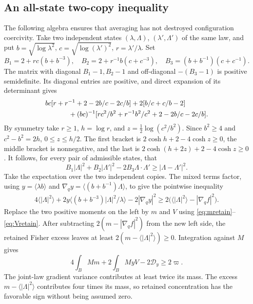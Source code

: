 \documentclass[11pt]{article}
\numberwithin{equation}{section}
\newcommand{\grad}{\nabla}
\newcommand{\Dy}{\mathcal D_y}
\newcommand{\pair}[1]{\langle #1\rangle}
\begin{document}
\subsection{An all-state two-copy inequality}\label{subsec:matrix}
The following algebra ensures that averaging has not destroyed configuration
coercivity. Take two independent states $(\lambda,\Lambda)$,
$(\lambda',\Lambda')$ of the same law, and put
$b=\sqrt{\log\lambda^2}$, $c=\sqrt{\log(\lambda')^2}$, $r=\lambda'/\lambda$.
Set
\[
 B_1=2+rc(b+b^{-3}),\quad
 B_2=2+r^{-1}b(c+c^{-3}),\quad
 B_3=(b+b^{-1})(c+c^{-1}).
\]
The matrix with diagonal $B_1-1,B_2-1$ and off-diagonal $-(B_3-1)$ is
positive semidefinite. Its diagonal entries are positive, and direct expansion
of its determinant gives
\begin{align*}
 &bc[r+r^{-1}+2-2b/c-2c/b]+2[b/c+c/b-2]\\
 &\hspace{12mm}+(bc)^{-1}
       [rc^2/b^2+r^{-1}b^2/c^2+2-2b/c-2c/b].
\end{align*}
By symmetry take $r\geq1$, $h=\log r$, and
$z=\tfrac12\log(c^2/b^2)$. Since $b^2\geq4$ and $c^2-b^2=2h$,
$0\leq z\leq h/2$. The first bracket is
$2\cosh h+2-4\cosh z\geq0$, the middle bracket is nonnegative, and the
last is $2\cosh(h+2z)+2-4\cosh z\geq0$.
It follows, for every pair of admissible states, that
\begin{equation}\label{eq:pairmatrix}
 B_1|\Lambda|^2+B_2|\Lambda'|^2-2B_3\Lambda\cdot\Lambda'
       \geq|\Lambda-\Lambda'|^2.
\end{equation}
Take the expectation over the two independent copies. The mixed terms factor,
using $y=\pair{\lambda b}$ and
$\grad_qy=\pair{(b+b^{-1})\Lambda}$, to give the pointwise inequality
\begin{equation}\label{eq:pairaverage}
\begin{aligned}
 4\pair{|\Lambda|^2}
 +2y\pair{(b+b^{-3})|\Lambda|^2/\lambda}
 -2|\grad_qy|^2
 \geq 2\bigl(\pair{|\Lambda|^2}-|\grad_qf|^2\bigr).
\end{aligned}
\end{equation}
Replace the two positive moments on the left by $m$ and $V$ using
\eqref{eq:mretain}--\eqref{eq:Vretain}. After subtracting
$2(m-|\grad_qf|^2)$ from the new left side, the retained Fisher excess leaves
at least $2(m-\pair{|\Lambda|^2})\geq0$. Integration against $M$ gives
\begin{equation}\label{eq:Fishercoercive}
 4\int_BMm+2\int_BMyV-2\Dy\geq2\varpi.
\end{equation}
The joint-law gradient variance contributes at least twice its mass.
The excess $m-\pair{|\Lambda|^2}$ contributes four times its mass, so
retained concentration has the favorable sign without being assumed zero.
\end{document}
